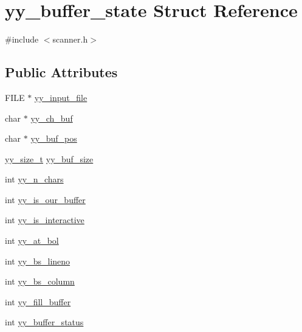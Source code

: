 \hypertarget{structyy__buffer__state}{\section{yy\-\_\-buffer\-\_\-state Struct Reference}
\label{structyy__buffer__state}
}


{\ttfamily \#include $<$scanner.\-h$>$}

\subsection*{Public Attributes}
\begin{DoxyCompactItemize}
\item 
F\-I\-L\-E $\ast$ \hyperlink{structyy__buffer__state_a4360acfb226a1fc240ab2be17dd6beda}{yy\-\_\-input\-\_\-file}
\item 
char $\ast$ \hyperlink{structyy__buffer__state_a0d25458e69eb22207fc633a1255d099d}{yy\-\_\-ch\-\_\-buf}
\item 
char $\ast$ \hyperlink{structyy__buffer__state_a8435c3f786bbb55d21d0174e4cfc22a0}{yy\-\_\-buf\-\_\-pos}
\item 
\hyperlink{scanner_8c_ad557845057f187eec4be07e2717d2afa}{yy\-\_\-size\-\_\-t} \hyperlink{structyy__buffer__state_a48302f5f3477a9c78bbddf56d356ef54}{yy\-\_\-buf\-\_\-size}
\item 
int \hyperlink{structyy__buffer__state_a06406208824817acfec2183b79080945}{yy\-\_\-n\-\_\-chars}
\item 
int \hyperlink{structyy__buffer__state_a80ce2431c70dc4f89ced487f18449465}{yy\-\_\-is\-\_\-our\-\_\-buffer}
\item 
int \hyperlink{structyy__buffer__state_abf5c70eea75581b58c0ee7bd31b14490}{yy\-\_\-is\-\_\-interactive}
\item 
int \hyperlink{structyy__buffer__state_a9d60c60af6e1a6f69de16871fd64f85f}{yy\-\_\-at\-\_\-bol}
\item 
int \hyperlink{structyy__buffer__state_a818e94bc9c766e683c60df1e9fd01199}{yy\-\_\-bs\-\_\-lineno}
\item 
int \hyperlink{structyy__buffer__state_a10c4fcd8be759e6bf11e6d3e8cdb0307}{yy\-\_\-bs\-\_\-column}
\item 
int \hyperlink{structyy__buffer__state_a63d2afbb1d79a3fc63df9e12626f827d}{yy\-\_\-fill\-\_\-buffer}
\item 
int \hyperlink{structyy__buffer__state_a70fd925d37a2f0454fbd0def675d106c}{yy\-\_\-buffer\-\_\-status}
\end{DoxyCompactItemize}


